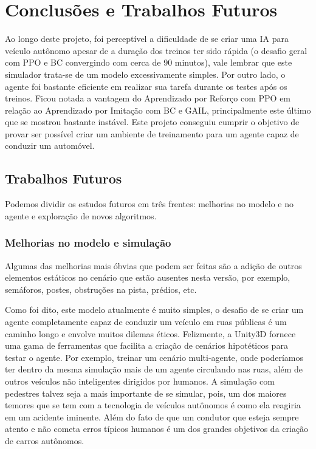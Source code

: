 \chapter*{Conclusões e Trabalhos Futuros}\label{cap:conclusao}

Ao longo deste projeto, foi perceptível a dificuldade de se criar uma IA para veículo autônomo apesar de a duração dos treinos ter sido rápida (o desafio geral com PPO e BC convergindo com cerca de 90 minutos), vale lembrar que este simulador trata-se de um modelo excessivamente simples. Por outro lado, o agente foi bastante eficiente em realizar sua tarefa durante os testes após os treinos. Ficou notada a vantagem do Aprendizado por Reforço com PPO em relação ao Aprendizado por Imitação com BC e GAIL, principalmente este último que se mostrou bastante instável. Este projeto conseguiu cumprir o objetivo de provar ser possível criar um ambiente de treinamento para um agente capaz de conduzir um automóvel.

\section*{Trabalhos Futuros}

Podemos dividir os estudos futuros em três frentes: melhorias no modelo e no agente e exploração de novos algoritmos.

\subsection*{Melhorias no modelo e simulação}
Algumas das melhorias mais óbvias que podem ser feitas são a adição de outros elementos estáticos no cenário que estão ausentes nesta versão, por exemplo, semáforos, postes, obstruções na pista, prédios, etc. 

Como foi dito, este modelo atualmente é muito simples, o desafio de se criar um agente completamente capaz de conduzir um veículo em ruas públicas é um caminho longo e envolve muitos dilemas éticos. Felizmente, a Unity3D fornece uma gama de ferramentas que facilita a criação de cenários hipotéticos para testar o agente. Por exemplo, treinar um cenário multi-agente, onde poderíamos ter dentro da mesma simulação mais de um agente circulando nas ruas, além de outros veículos não inteligentes dirigidos por humanos. A simulação com pedestres talvez seja a mais importante de se simular, pois, um dos maiores temores que se tem com a tecnologia de veículos autônomos é como ela reagiria em um acidente iminente. Além do fato de que um condutor que esteja sempre atento e não cometa erros típicos humanos é um dos grandes objetivos da criação de carros autônomos.

